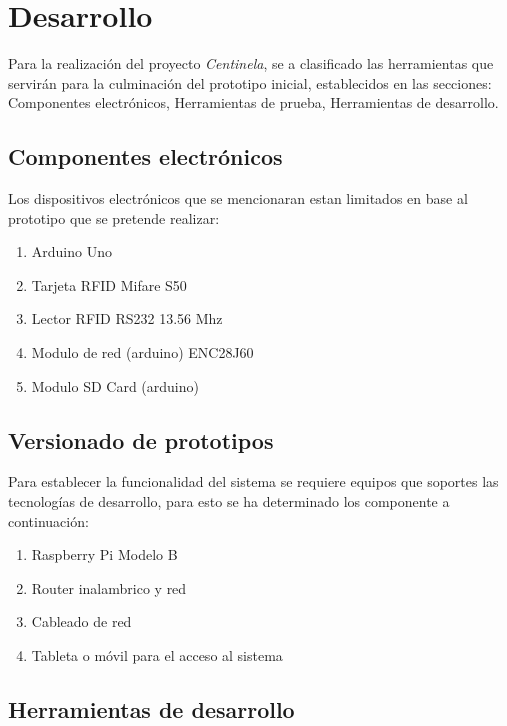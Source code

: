 \documentclass[11pt,twocolumn]{article}
\begin{document}
\section{Desarrollo}

Para la realizaci\'on del proyecto \textit{Centinela}, se a clasificado las herramientas que servir\'an para la culminaci\'on del prototipo inicial, establecidos en las secciones: Componentes electr\'onicos, Herramientas de prueba, Herramientas de desarrollo.

	\subsection{Componentes electr\'onicos}

	Los  dispositivos electr\'onicos que se mencionaran estan limitados en base al prototipo que se pretende realizar:\\
	
	\begin{enumerate}
		\item Arduino Uno
		\item Tarjeta RFID Mifare S50
		\item Lector RFID RS232 13.56 Mhz
		\item Modulo de red (arduino) ENC28J60
		\item Modulo SD Card (arduino)
	\end{enumerate}
	
	\subsection{Versionado de prototipos}

	Para establecer la funcionalidad del sistema se requiere equipos que soportes las tecnolog\'ias de desarrollo, para esto se ha determinado los componente a continuaci\'on: \\
	
	\begin{enumerate}
		\item Raspberry Pi Modelo B 
		\item Router inalambrico y red
		\item Cableado de red 
		\item Tableta o m\'ovil para el acceso al sistema
	\end{enumerate}
	
	\subsection{Herramientas de desarrollo}
	
\end{document}
